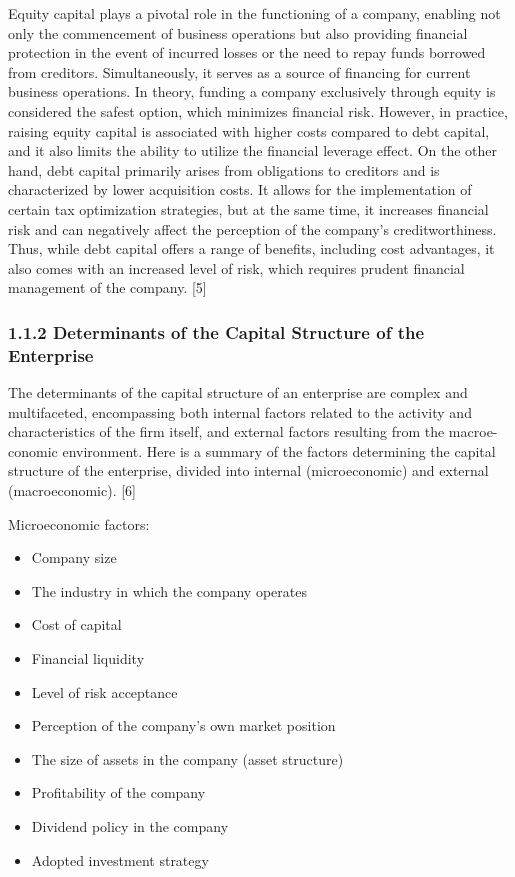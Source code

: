 \documentclass{article}
\begin{document}
\begin{flushleft}
\begin{justify}
Equity capital plays a pivotal role in the functioning of a company, enabling
not only the commencement of business operations but also providing financial
protection in the event of incurred losses or the need to repay funds borrowed
from creditors. Simultaneously, it serves as a source of financing for current
business operations. In theory, funding a company exclusively through equity
is considered the safest option, which minimizes financial risk. However, in
practice, raising equity capital is associated with higher costs compared to debt
capital, and it also limits the ability to utilize the financial leverage effect.
On the other hand, debt capital primarily arises from obligations to creditors
and is characterized by lower acquisition costs. It allows for the implementation
of certain tax optimization strategies, but at the same time, it increases financial
risk and can negatively affect the perception of the company’s creditworthiness.
Thus, while debt capital offers a range of benefits, including cost advantages,
it also comes with an increased level of risk, which requires prudent financial
management of the company. [5]

\subsubsection{1.1.2 Determinants of the Capital Structure of the Enterprise}

The determinants of the capital structure of an enterprise are complex and
multifaceted, encompassing both internal factors related to the activity and
characteristics of the firm itself, and external factors resulting from the macroe-
conomic environment. Here is a summary of the factors determining the capital
structure of the enterprise, divided into internal (microeconomic) and external
(macroeconomic). [6]

Microeconomic factors:
\begin{itemize}
\item{Company size}
\item{The industry in which the company operates}
\item{Cost of capital}
\item{Financial liquidity}
\item{Level of risk acceptance}
\item{Perception of the company’s own market position}
\item{The size of assets in the company (asset structure)}
\item{Profitability of the company}
\item{Dividend policy in the company}
\item{Adopted investment strategy}
\end{itemize}


\end{justify}
\end{flushleft}
\end{document}
